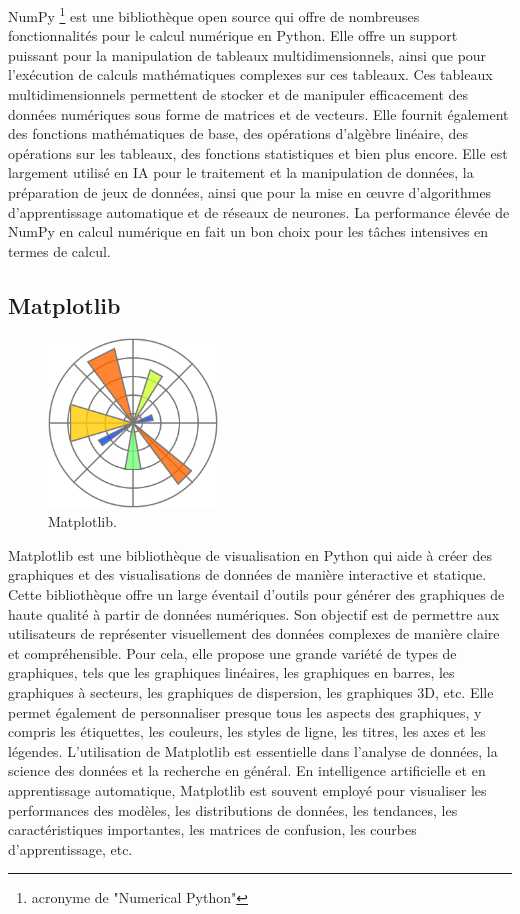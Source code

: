 NumPy \footnote{acronyme de "Numerical Python"} est une bibliothèque open source qui offre de nombreuses fonctionnalités pour le calcul numérique en Python. Elle offre un support puissant pour la manipulation de tableaux multidimensionnels, ainsi que pour l'exécution de calculs mathématiques complexes sur ces tableaux. Ces tableaux multidimensionnels permettent de stocker et de manipuler efficacement des données numériques sous forme de matrices et de vecteurs. Elle fournit également des fonctions mathématiques de base, des opérations d'algèbre linéaire, des opérations sur les tableaux, des fonctions statistiques et bien plus encore. Elle est largement utilisé en IA pour le traitement et la manipulation de données, la préparation de jeux de données, ainsi que pour la mise en œuvre d'algorithmes d'apprentissage automatique et de réseaux de neurones. La performance élevée de NumPy en calcul numérique en fait un bon choix pour les tâches intensives en termes de calcul.


\subsection{Matplotlib}
\begin{figure}[hbt!]
  \centering
  \includegraphics[width=4.5cm]{images_pfe/matplotlib.png}
  \caption{Matplotlib.}
  \label{fig:matplotlib}
\end{figure}
\FloatBarrier
\medskip

Matplotlib est une bibliothèque de visualisation en Python qui aide à créer des graphiques et des visualisations de données de manière interactive et statique. Cette bibliothèque offre un large éventail d'outils pour générer des graphiques de haute qualité à partir de données numériques. Son objectif est de permettre aux utilisateurs de représenter visuellement des données complexes de manière claire et compréhensible. Pour cela, elle propose une grande variété de types de graphiques, tels que les graphiques linéaires, les graphiques en barres, les graphiques à secteurs, les graphiques de dispersion, les graphiques 3D, etc. Elle permet également de personnaliser presque tous les aspects des graphiques, y compris les étiquettes, les couleurs, les styles de ligne, les titres, les axes et les légendes. L'utilisation de Matplotlib est essentielle dans l'analyse de données, la science des données et la recherche en général. En intelligence artificielle et en apprentissage automatique, Matplotlib est souvent employé pour visualiser les performances des modèles, les distributions de données, les tendances, les caractéristiques importantes, les matrices de confusion, les courbes d'apprentissage, etc.


